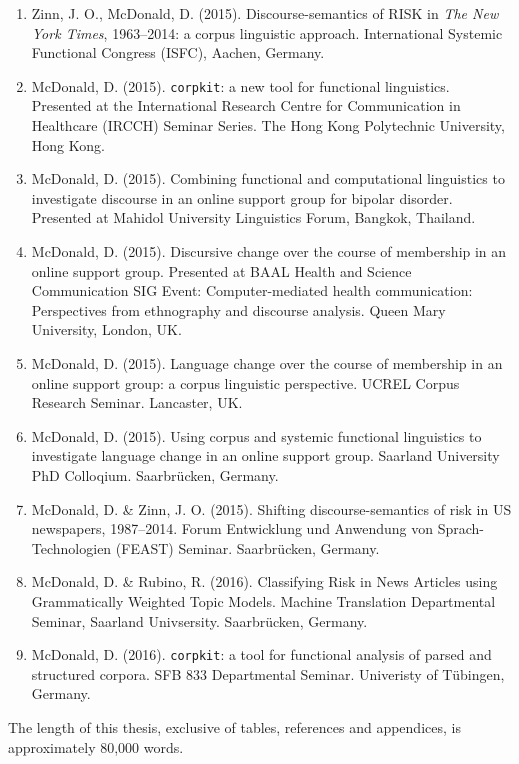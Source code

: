 \documentclass[a4paper,10pt,abstract=on]{scrreprt}
\newcommand{\sctext}[1]{\small\MakeUppercase{#1}\normalsize}
\begin{document}
\begin{enumerate}
    \item Zinn, J. O., McDonald, D. (2015). Discourse\hyp{}semantics of \sctext{risk} in \emph{The New York Times}, 1963--2014: a corpus linguistic approach. International Systemic Functional Congress (ISFC), Aachen, Germany.
    \item McDonald, D. (2015). \texttt{corpkit}: a new tool for functional linguistics. Presented at the International Research Centre for Communication in Healthcare (IRCCH) Seminar Series. The Hong Kong Polytechnic University, Hong Kong.
    \item McDonald, D. (2015). Combining functional and computational linguistics to investigate discourse in an online support group for bipolar disorder. Presented at Mahidol University Linguistics Forum, Bangkok, Thailand.
    \item McDonald, D. (2015). Discursive change over the course of membership in an online support group. Presented at BAAL Health and Science Communication SIG Event: Computer-mediated health communication: Perspectives from ethnography and discourse analysis. Queen Mary University, London, UK.
    \item McDonald, D. (2015). Language change over the course of membership in an online support group: a corpus linguistic perspective. UCREL Corpus Research Seminar. Lancaster, UK.
    \item McDonald, D. (2015). Using corpus and systemic functional linguistics to investigate language change in an online support group. Saarland University PhD Colloqium. Saarbr{\"u}cken, Germany.
    \item McDonald, D. \& Zinn, J. O. (2015). Shifting discourse\hyp{}semantics of risk in US newspapers, 1987--2014. Forum Entwicklung und Anwendung von Sprach-Technologien (FEAST) Seminar. Saarbr{\"u}cken, Germany.
    \item McDonald, D. \& Rubino, R. (2016). Classifying Risk in News Articles using Grammatically Weighted Topic Models. Machine Translation Departmental Seminar, Saarland Univsersity. Saarbr{\"u}cken, Germany.
    \item McDonald, D. (2016). \texttt{corpkit}: a tool for functional analysis of parsed and structured corpora. SFB 833 Departmental Seminar. Univeristy of T{\"u}bingen, Germany.
\end{enumerate}

\clearpage

\noindent The length of this thesis, exclusive of tables, references and appendices, is approximately 80,000 words. ~\\~\\
\end{document}
